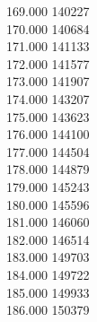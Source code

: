 { 169.000	140227 \\
 170.000	140684 \\
 171.000	141133 \\
 172.000	141577 \\
 173.000	141907 \\
 174.000	143207 \\
 175.000	143623 \\
 176.000	144100 \\
 177.000	144504 \\
 178.000	144879 \\
 179.000	145243 \\
 180.000	145596 \\
 181.000	146060 \\
 182.000	146514 \\
 183.000	149703 \\
 184.000	149722 \\
 185.000	149933 \\
 186.000	150379 \\
}
